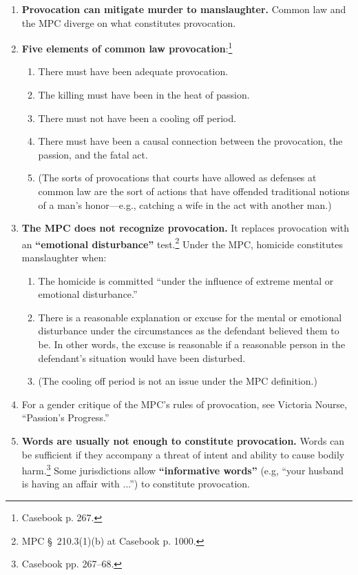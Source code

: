 \begin{enumerate}
    \item \textbf{Provocation can mitigate murder to manslaughter.} Common law 
    and the MPC diverge on what constitutes provocation.
    \item \textbf{Five elements of common law provocation}:\footnote{Casebook p. 267.}
    \begin{enumerate}
        \item There must have been adequate provocation.
        \item The killing must have been in the heat of passion.
        \item There must not have been a cooling off period.
        \item There must have been a causal connection between the 
        provocation, the passion, and the fatal act.
        \item (The sorts of provocations that courts have allowed as defenses 
        at common law are the sort of actions that have offended traditional 
        notions of a man's honor---e.g., catching a wife in the act with 
        another man.)
    \end{enumerate}
    \item \textbf{The MPC does not recognize provocation.} It replaces 
    provocation with an \textbf{``emotional disturbance''} test.\footnote{MPC 
    § 210.3(1)(b) at Casebook p. 1000.} Under the MPC, homicide constitutes 
    manslaughter when:
    \begin{enumerate}
        \item The homicide is committed ``under the influence of extreme 
        mental or emotional disturbance.''
        \item There is a reasonable explanation or excuse for the mental or 
        emotional disturbance under the circumstances as the defendant 
        believed them to be. In other words, the excuse is reasonable if a 
        reasonable person in the defendant's situation would have been 
        disturbed.
        \item (The cooling off period is not an issue under the MPC 
        definition.)
    \end{enumerate}
    \item For a gender critique of the MPC's rules of provocation, see 
    Victoria Nourse, ``Passion's Progress.''
    \item \textbf{Words are usually not enough to constitute provocation.} 
    Words can be sufficient if they accompany a threat of intent and ability 
    to cause bodily harm.\footnote{Casebook pp. 267--68.} Some jurisdictions 
    allow \textbf{``informative words''} (e.g, ``your husband is having an 
    affair with ...'') to constitute provocation.
\end{enumerate}

